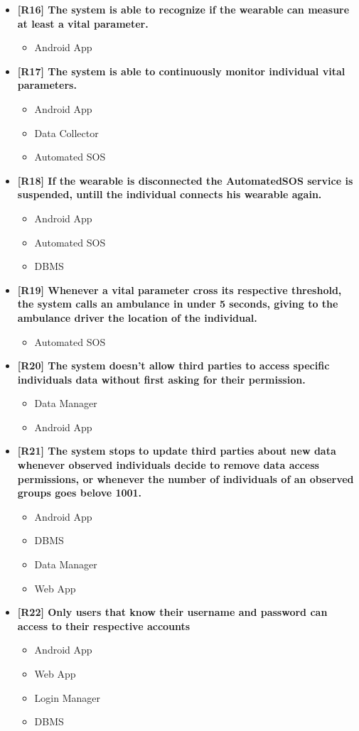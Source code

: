 \begin{itemize}
\item \textbf{[R16] The system is able to recognize if the wearable can measure at least a vital parameter.}
\begin{itemize}
\item Android App
\end{itemize}

\item \textbf{[R17] The system is able to continuously monitor individual vital parameters.}
\begin{itemize}
\item Android App
\item Data Collector
\item Automated SOS
\end{itemize}

\item \textbf{[R18] If the wearable is disconnected the AutomatedSOS service is suspended, untill the individual connects his wearable again.}
\begin{itemize}
\item Android App
\item Automated SOS
\item DBMS
\end{itemize}

\item \textbf{[R19] Whenever a vital parameter cross its respective threshold, the system calls an ambulance in under 5 seconds, giving to the ambulance driver the location of the individual.}
\begin{itemize}
\item Automated SOS
\end{itemize}

\item \textbf{[R20] The system doesn't allow third parties to access specific individuals data without first asking for their permission.}
\begin{itemize}
\item Data Manager
\item Android App
\end{itemize}

\item \textbf{[R21] The system stops to update third parties about new data whenever observed individuals decide to remove data access permissions, or whenever the number of individuals of an observed groups goes belove 1001.}
\begin{itemize}
\item Android App
\item DBMS
\item Data Manager
\item Web App
\end{itemize}


\item \textbf{[R22] Only users that know their username and password can access to their respective accounts}
\begin{itemize}
\item Android App
\item Web App
\item Login Manager
\item DBMS
\end{itemize}
\end{itemize}



